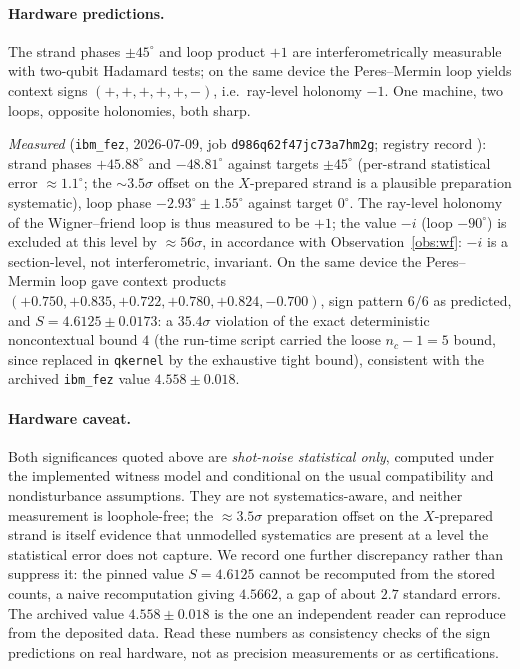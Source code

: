 \documentclass[11pt]{article}
\theoremstyle{remark}
\theoremstyle{plain}
\begin{document}
\paragraph{Hardware predictions.} The strand phases $\pm 45^\circ$ and loop product $+1$
are interferometrically measurable with two-qubit Hadamard tests; on the same device the
Peres--Mermin loop yields context signs $(+,+,+,+,+,-)$, i.e.\ ray-level holonomy $-1$.
One machine, two loops, opposite holonomies, both sharp.

\emph{Measured} (\texttt{ibm\_fez}, 2026-07-09, job \texttt{d986q62f47jc73a7hm2g};
registry record ): strand phases
$+45.88^\circ$ and $-48.81^\circ$ against targets $\pm45^\circ$ (per-strand statistical error
$\approx1.1^\circ$; the $\sim3.5\sigma$ offset on the $X$-prepared strand is a plausible
preparation systematic), loop phase $-2.93^\circ\pm1.55^\circ$ against target $0^\circ$. The
ray-level holonomy of the Wigner--friend loop is thus measured to be $+1$; the value $-i$
(loop $-90^\circ$) is excluded at this level by $\approx 56\sigma$, in accordance with
Observation~\ref{obs:wf}: $-i$ is a section-level, not interferometric, invariant. On the
same device the Peres--Mermin loop gave context products
$(+0.750,+0.835,+0.722,+0.780,+0.824,-0.700)$, sign pattern $6/6$ as predicted, and
$S=4.6125\pm0.0173$: a $35.4\sigma$ violation of the exact deterministic noncontextual bound
$4$ (the run-time script carried the loose $n_c-1=5$ bound, since replaced in
\texttt{qkernel} by the exhaustive tight bound), consistent with the archived
\texttt{ibm\_fez} value $4.558\pm0.018$.

\paragraph{Hardware caveat.} Both significances quoted above are \emph{shot-noise
statistical only}, computed under the implemented witness model and conditional on the
usual compatibility and nondisturbance assumptions. They are not systematics-aware, and
neither measurement is loophole-free; the $\approx3.5\sigma$ preparation offset on the
$X$-prepared strand is itself evidence that unmodelled systematics are present at a level
the statistical error does not capture. We record one further discrepancy rather than
suppress it: the pinned value $S=4.6125$ cannot be recomputed from the stored counts, a
naive recomputation giving $4.5662$, a gap of about $2.7$ standard errors. The archived
value $4.558\pm0.018$ is the one an independent reader can reproduce from the deposited
data. Read these numbers as consistency checks of the sign predictions on real hardware,
not as precision measurements or as certifications.
\end{document}
